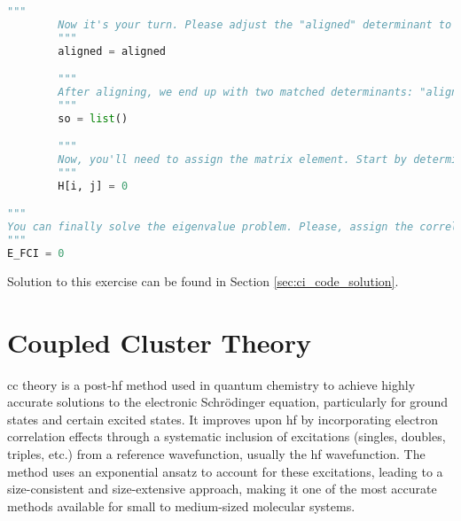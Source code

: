 \begin{lstlisting}[language=Python, caption={\acrshort{ci} exercise code.}, label=code:ci_exercise]
        """
        Now it's your turn. Please adjust the "aligned" determinant to match the i-th determinant as closely as possible. By "align", I mean you should execute a series of spinorbital swaps to minimize the differences between the "aligned" and the i-th determinant. It's also important to monitor the number of swaps you make, as each swap affects the sign of the determinant, hence the reason for the "sign" variable defined earlier. This task is not straightforward, so don't hesitate to reach out to the authors if you need guidance.
        """
        aligned = aligned

        """
        After aligning, we end up with two matched determinants: "aligned" and "dets[i]". At this point, we can apply the Slater-Condon rules. I suggested earlier that the input for these rules should be an array combining both unique and common spinorbitals. You can prepare this array now. However, if you've designed your Slater-Condon rules to directly accept the determinants instead, you can skip this preparatory step.
        """
        so = list()

        """
        Now, you'll need to assign the matrix element. Start by determining the number of differences between the two determinants. Based on this number, apply the corresponding Slater-Condon rule. Don't forget to multiply the result by the sign to account for any changes due to swaps made during the alignment of the determinants.
        """
        H[i, j] = 0

"""
You can finally solve the eigenvalue problem. Please, assign the correlation energy to the "E_FCI" variable.
"""
E_FCI = 0
\end{lstlisting}

Solution to this exercise can be found in Section \ref{sec:ci_code_solution}.
\chapter{Coupled Cluster Theory}

\acrfull{cc} theory is a \acrshort{post-hf} method used in quantum chemistry to achieve highly accurate solutions to the electronic Schrödinger equation, particularly for ground states and certain excited states. It improves upon \acrshort{hf} by incorporating electron correlation effects through a systematic inclusion of excitations (singles, doubles, triples, etc.) from a reference wavefunction, usually the \acrshort{hf} wavefunction. The method uses an exponential ansatz to account for these excitations, leading to a size-consistent and size-extensive approach, making it one of the most accurate methods available for small to medium-sized molecular systems.

